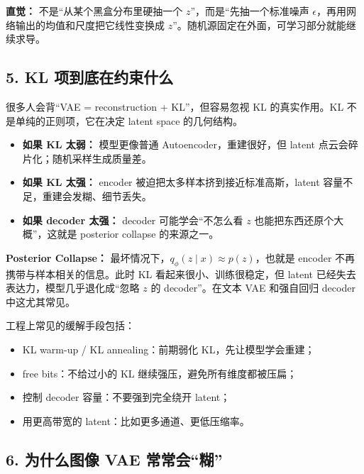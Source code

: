 \begin{intubox}
\textbf{直觉：} 不是“从某个黑盒分布里硬抽一个 $z$”，而是“先抽一个标准噪声 $\epsilon$，再用网络输出的均值和尺度把它线性变换成 $z$”。随机源固定在外面，可学习部分就能继续求导。
\end{intubox}

\subsection{5. KL 项到底在约束什么}

很多人会背“VAE = reconstruction + KL”，但容易忽视 KL 的真实作用。KL 不是单纯的正则项，它在决定 latent space 的几何结构。

\begin{itemize}[leftmargin=1.5em]
  \item \textbf{如果 KL 太弱：} 模型更像普通 Autoencoder，重建很好，但 latent 点云会碎片化；随机采样生成质量差。
  \item \textbf{如果 KL 太强：} encoder 被迫把太多样本挤到接近标准高斯，latent 容量不足，重建会发糊、细节丢失。
  \item \textbf{如果 decoder 太强：} decoder 可能学会“不怎么看 $z$ 也能把东西还原个大概”，这就是 posterior collapse 的来源之一。
\end{itemize}

\begin{warnbox}
\textbf{Posterior Collapse：} 最坏情况下，$q_\phi(z\mid x)\approx p(z)$，也就是 encoder 不再携带与样本相关的信息。此时 KL 看起来很小、训练很稳定，但 latent 已经失去表达力，模型几乎退化成“忽略 $z$ 的 decoder”。在文本 VAE 和强自回归 decoder 中这尤其常见。
\end{warnbox}

工程上常见的缓解手段包括：

\begin{itemize}[leftmargin=1.5em]
  \item KL warm-up / KL annealing：前期弱化 KL，先让模型学会重建；
  \item free bits：不给过小的 KL 继续强压，避免所有维度都被压扁；
  \item 控制 decoder 容量：不要强到完全绕开 latent；
  \item 用更高带宽的 latent：比如更多通道、更低压缩率。
\end{itemize}

\subsection{6. 为什么图像 VAE 常常会“糊”}

